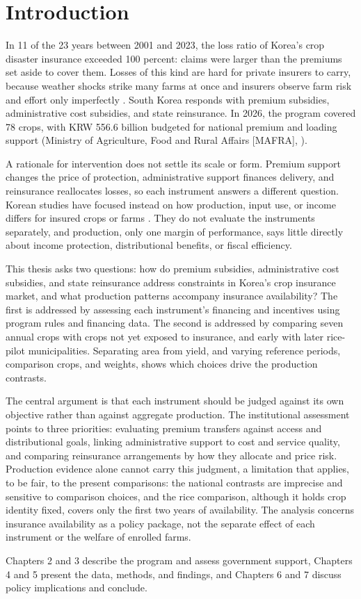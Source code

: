 \chapter{Introduction}\label{ch:introduction}

In 11 of the 23 years between 2001 and 2023, the loss ratio of Korea's crop disaster insurance exceeded 100 percent: claims were larger than the premiums set aside to cover them. Losses of this kind are hard for private insurers to carry, because weather shocks strike many farms at once and insurers observe farm risk and effort only imperfectly \citep{miranda1997,mahul2010}. South Korea responds with premium subsidies, administrative cost subsidies, and state reinsurance. In 2026, the program covered 78 crops, with KRW 556.6 billion budgeted for national premium and loading support (Ministry of Agriculture, Food and Rural Affairs [MAFRA], \citeyear{mafra2026}).

A rationale for intervention does not settle its scale or form. Premium support changes the price of protection, administrative support finances delivery, and reinsurance reallocates losses, so each instrument answers a different question. Korean studies have focused instead on how production, input use, or income differs for insured crops or farms \citep{han2014,nam2022,leekim2026}. They do not evaluate the instruments separately, and production, only one margin of performance, says little directly about income protection, distributional benefits, or fiscal efficiency.

This thesis asks two questions: how do premium subsidies, administrative cost subsidies, and state reinsurance address constraints in Korea's crop insurance market, and what production patterns accompany insurance availability? The first is addressed by assessing each instrument's financing and incentives using program rules and financing data. The second is addressed by comparing seven annual crops with crops not yet exposed to insurance, and early with later rice-pilot municipalities. Separating area from yield, and varying reference periods, comparison crops, and weights, shows which choices drive the production contrasts.

The central argument is that each instrument should be judged against its own objective rather than against aggregate production. The institutional assessment points to three priorities: evaluating premium transfers against access and distributional goals, linking administrative support to cost and service quality, and comparing reinsurance arrangements by how they allocate and price risk. Production evidence alone cannot carry this judgment, a limitation that applies, to be fair, to the present comparisons: the national contrasts are imprecise and sensitive to comparison choices, and the rice comparison, although it holds crop identity fixed, covers only the first two years of availability. The analysis concerns insurance availability as a policy package, not the separate effect of each instrument or the welfare of enrolled farms.

Chapters 2 and 3 describe the program and assess government support, Chapters 4 and 5 present the data, methods, and findings, and Chapters 6 and 7 discuss policy implications and conclude.
